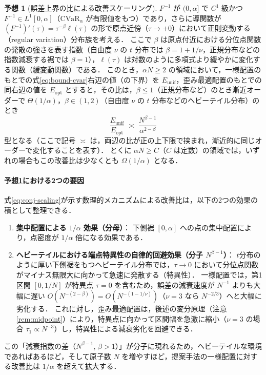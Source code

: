 \documentclass[a4paper,10pt]{jsarticle}
\theoremstyle{definition}
\newtheorem{conjecture}{予想}[section]
\newcommand{\CVaR}{\mathrm{CVaR}}
\renewcommand{\Finv}{F^{-1}}
\begin{document}
\begin{conjecture}[誤差上界の比による改善スケーリング]
\label{conj:alpha}
$\Finv$ が $(0,\alpha]$ で $C^1$ 級かつ $\Finv\in L^1[0,\alpha]$（$\CVaR_\alpha$ が有限値をもつ）であり，さらに導関数が $(\Finv)'(\tau)=\tau^{-\beta}\ell(\tau)$ の形で原点近傍（$\tau\to+0$）において正則変動する（regular variation）分布族を考える．
ここで $\beta$ は原点付近における分位点関数の発散の強さを表す指数（自由度 $\nu$ の $t$ 分布では $\beta=1+1/\nu$，正規分布などの指数減衰する裾では $\beta=1$），$\ell(\tau)$ は対数のように多項式より緩やかに変化する関数（緩変動関数）である．
このとき，$\alpha N\ge2$ の領域において，一様配置のもとでの式\eqref{eq:bound-cvar}右辺の値（の下界）を $E_{\mathrm{unif}}$，歪み最適配置のもとでの同右辺の値を $E_{\mathrm{opt}}$ とすると，その比は，$\beta\le1$（正規分布など）のとき漸近オーダーで $\Theta(1/\alpha)$，$\beta\in(1,2)$（自由度 $\nu$ の $t$ 分布などのヘビーテイル分布）のとき
\begin{equation}
  \frac{E_{\mathrm{unif}}}{E_{\mathrm{opt}}} \;\asymp\; \frac{N^{\beta-1}}{\alpha^{2-\beta}}
  \label{eq:conj-scaling}
\end{equation}
型となる（ここで記号 $\asymp$ は，両辺の比が正の上下限で挟まれ，漸近的に同じオーダーで変化することを表す）．
とくに $\alpha N\ge C$（$C$ は定数）の領域では，いずれの場合もこの改善比は少なくとも $\Omega(1/\alpha)$ となる．
\end{conjecture}

\paragraph{予想\ref{conj:alpha}における2つの要因}
式\eqref{eq:conj-scaling}が示す数理的メカニズムによる改善比は，以下の2つの効果の積として整理できる．
\begin{enumerate}
  \item \textbf{集中配置による $1/\alpha$ 効果（分母）}：
  下側裾 $[0, \alpha]$ への点の集中配置により，点密度が $1/\alpha$ 倍になる効果である．
  \item \textbf{ヘビーテイルにおける端点特異性の自律的回避効果（分子 $N^{\beta-1}$）}：
  $t$分布のように厚い下側裾をもつヘビーテイル分布では，$\tau \to 0$ において分位点関数がマイナス無限大に向かって急速に発散する（特異性）．
  一様配置では，第1区間 $[0, 1/N]$ が特異点 $\tau=0$ を含むため，誤差の減衰速度が $N^{-1}$ よりも大幅に遅い $O(N^{-(2-\beta)}) = O(N^{-(1-1/\nu)})$（$\nu=3$ なら $N^{-2/3}$）へと大幅に劣化する．
  これに対し，歪み最適配置は，後述の変分原理（注意\ref{rem:midpoint}）により，特異点に向かって区間幅を急激に縮小（$\nu=3$ の場合 $\tau_1 \propto N^{-3}$）し，特異性による減衰劣化を回避できる．
\end{enumerate}
この「減衰指数の差（$N^{\beta-1}$, $\beta > 1$）」が分子に現れるため，ヘビーテイルな環境であればあるほど，そして原子数 $N$ を増やすほど，提案手法の一様配置に対する改善比は $1/\alpha$ を超えて拡大する．
\end{document}
